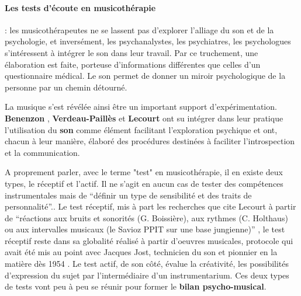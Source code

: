 \paragraph{Les tests d'écoute en musicothérapie}:
\label{musicothEtpsycho}
les musicothérapeutes ne se lassent pas d'explorer l'alliage du son
 et de la psychologie, et inversément, les psychanalystes, les psychiatres, les psychologues
 s'intéressent à intégrer le son dans leur travail. Par ce truchement,
 une élaboration est faite, porteuse d'informations différentes que
 celles d'un questionnaire médical. Le son permet de donner un miroir
 psychologique de la personne par un chemin détourné.

La musique s'est révélée ainsi être un important support
         d'expérimentation.   \textbf{Benenzon} \autocite{benenzon:musicotherapie},\textbf{ Verdeau-Paillès} \autocite{verdeau-pailles:bilan} et
         \textbf{Lecourt }\autocite{lecourt_les_2017}
         ont su intégrer dans leur pratique l'utilisation du\textbf{ son }comme
         élément facilitant l'exploration psychique et
         ont, chacun à leur manière, élaboré des procédures destinées à faciliter
         l'introspection et la communication.


         A proprement parler, avec le terme "test" en musicothérapie, il en existe deux types, le réceptif et 
         l'actif. Il ne s'agit en aucun cas de tester des compétences instrumentales mais de \enquote {définir 
         un type de sensibilité et des traits de personnalité}.\autocite[83]{lecourt_les_2017}.
Le test réceptif, mis à part les recherches que cite Lecourt à partir de \enquote {réactions aux bruits et sonorités (G. Boissière), aux rythmes (C. Holthaus) ou aux intervalles musicaux (le Savioz PPIT sur une base jungienne)} \autocite[83]{lecourt_les_2017}, le test réceptif reste dans sa globalité réalisé à partir d'oeuvres musicales, protocole qui avait été mis au point avec Jacques Jost, technicien du son et pionnier en la matière dès 1954 \autocite{Jost}.
         Le test actif, de son côté, évalue la créativité, les possibilités d'expression du sujet par l'intermédiaire d'un instrumentarium. Ces deux types  de tests vont peu à peu se réunir pour former
                 le \textbf{ bilan
                     psycho-musical}.


